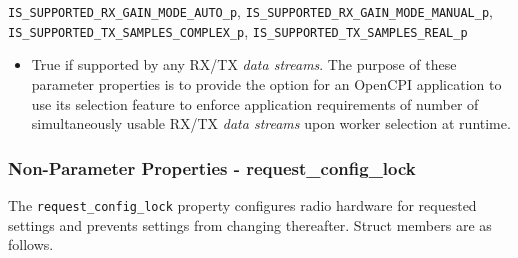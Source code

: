 \documentclass{article}
\begin{document}
\begin{itemize}
      \verb+IS_SUPPORTED_RX_GAIN_MODE_AUTO_p+,
      \verb+IS_SUPPORTED_RX_GAIN_MODE_MANUAL_p+, \\
      \verb+IS_SUPPORTED_TX_SAMPLES_COMPLEX_p+,
      \verb+IS_SUPPORTED_TX_SAMPLES_REAL_p+
      \begin{itemize}
        \item True if supported by any RX/TX \textit{data streams}.
          The purpose of these parameter properties is to provide the option for
          an OpenCPI
          application to use its selection feature\cite{ocpi_app_guide} to
          enforce
          application requirements of number of simultaneously usable
          RX/TX \textit{data streams} upon worker
          selection at runtime.
      \end{itemize}
  \end{itemize}

\pagebreak

\subsubsection{Non-Parameter Properties - request\_config\_lock}

  The \verb+request_config_lock+ property configures radio hardware for
  requested settings and prevents settings from changing thereafter. Struct
  members are
  as follows.
\end{document}
